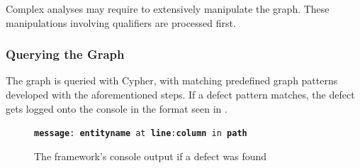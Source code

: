 Complex analyses may require to extensively manipulate the graph. These manipulations involving qualifiers are processed first.


\subsubsection{Querying the Graph}

The graph is queried with Cypher, with matching predefined graph patterns developed with the aforementioned steps. If a defect pattern matches, the defect gets logged onto the console in the format seen in .

\vspace{0.5em}
\begin{figure}[!htb]
	\centering
	\texttt{\textbf{message}: \textbf{entityname} at \textbf{line}:\textbf{column} in \textbf{path}}
  \caption{The framework's console output if a defect was found}
  \label{fig:defect-found-logger}
\end{figure}